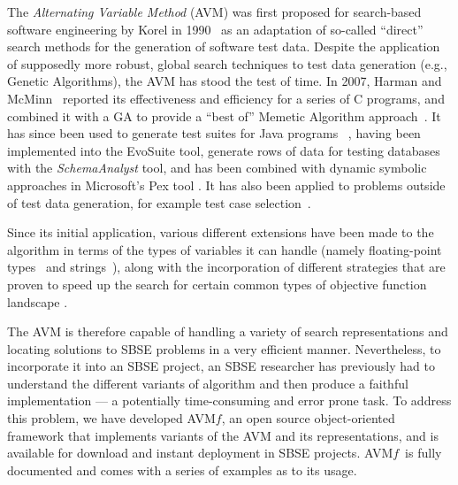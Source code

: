 \documentclass{llncs}
\newcommand{\AVM}{Alternating Variable Method\xspace}
\newcommand{\name}{AVM\hspace{-1pt}$f$\xspace}
\begin{document}
\vspace{-.5ex}
The {\it \AVM} (AVM) was first proposed for search-based software engineering by Korel in 1990~\cite{Korel1990} as an adaptation of so-called ``direct'' search methods \cite{Gill1974,Glass1965} for the generation of software test data.
Despite the application of supposedly more robust, global search techniques to test data generation (e.g., Genetic Algorithms), the AVM has stood the test of time. In 2007, Harman and McMinn~\cite{Harman2007} reported its effectiveness and efficiency for a series of C programs, and combined it with a GA to provide a ``best of'' Memetic Algorithm approach~\cite{Harman2010}. It has since been used to generate test suites for Java programs~
\cite{%
Fraser2015b}, having been implemented into the {\sc EvoSuite} tool, generate rows of data for testing databases~\cite{Kapfhammer2013,McMinn2015} with the {\it SchemaAnalyst} tool, and has been combined with dynamic symbolic approaches in Microsoft's Pex tool \cite{Lakhotia2010}.
It has also been applied to problems outside of test data generation, for example test case selection~\cite{Pradhan2016}.

Since its initial application, various different extensions have been made to the algorithm in terms of the types of variables it can handle (namely floating-point types~\cite{Harman2007} and strings~\cite{McMinn2015}), along with the incorporation of different strategies that are proven to speed up the search for certain common types of objective function landscape
\cite{%
Kempka2015}.

The AVM is therefore capable of handling a variety of search representations and locating solutions to SBSE problems in a very efficient manner. Nevertheless, to incorporate it into an SBSE project, an SBSE researcher has previously had to understand the different variants of algorithm and then produce a faithful implementation --- a potentially time-consuming and error prone task. To address this problem, we have developed \name, an open source object-oriented framework that implements variants of the AVM and its representations, and is available for download and instant deployment in SBSE projects. \name~is fully documented and comes with a series of examples as to its usage.
\end{document}
